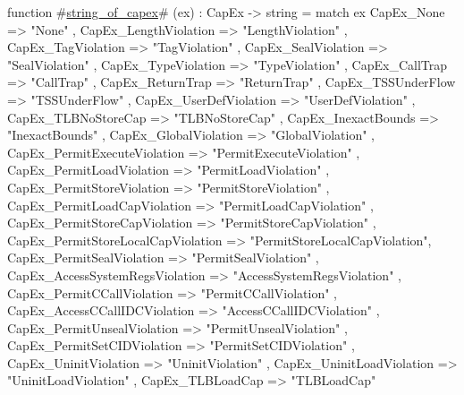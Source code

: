 function #\hyperref[zstringzyofzycapex]{string\_of\_capex}# (ex) : CapEx -> string = 
  match ex {
    CapEx_None                          => "None"                        ,
    CapEx_LengthViolation               => "LengthViolation"             ,
    CapEx_TagViolation                  => "TagViolation"                ,
    CapEx_SealViolation                 => "SealViolation"               ,
    CapEx_TypeViolation                 => "TypeViolation"               ,
    CapEx_CallTrap                      => "CallTrap"                    ,
    CapEx_ReturnTrap                    => "ReturnTrap"                  ,
    CapEx_TSSUnderFlow                  => "TSSUnderFlow"                ,
    CapEx_UserDefViolation              => "UserDefViolation"            ,
    CapEx_TLBNoStoreCap                 => "TLBNoStoreCap"               ,
    CapEx_InexactBounds                 => "InexactBounds"               ,
    CapEx_GlobalViolation               => "GlobalViolation"             ,
    CapEx_PermitExecuteViolation        => "PermitExecuteViolation"      ,
    CapEx_PermitLoadViolation           => "PermitLoadViolation"         ,
    CapEx_PermitStoreViolation          => "PermitStoreViolation"        ,
    CapEx_PermitLoadCapViolation        => "PermitLoadCapViolation"      ,
    CapEx_PermitStoreCapViolation       => "PermitStoreCapViolation"     ,
    CapEx_PermitStoreLocalCapViolation  => "PermitStoreLocalCapViolation",
    CapEx_PermitSealViolation           => "PermitSealViolation"         ,
    CapEx_AccessSystemRegsViolation     => "AccessSystemRegsViolation"   ,
    CapEx_PermitCCallViolation          => "PermitCCallViolation"        ,
    CapEx_AccessCCallIDCViolation       => "AccessCCallIDCViolation"     ,
    CapEx_PermitUnsealViolation         => "PermitUnsealViolation"       ,
    CapEx_PermitSetCIDViolation         => "PermitSetCIDViolation"       ,
    CapEx_UninitViolation               => "UninitViolation"             ,
    CapEx_UninitLoadViolation           => "UninitLoadViolation"	 ,
    CapEx_TLBLoadCap                    => "TLBLoadCap"
  }
